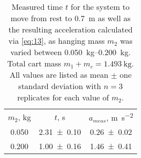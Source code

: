 \begin{table}[hb]
\caption{\label{tab:newtable1} Measured time $t$ for the system to move from rest to \qty{0.7}{\meter} as well as the resulting acceleration calculated via \cref{eq:13}, as hanging mass $m_2$ was varied between \qtyrange{0.050}{0.200}{\kilo\gram}.  Total cart mass $m_1 + m_c =\qty{1.493}{\kilogram}$. All values are listed as mean $\pm$ one standard deviation with $n=3$ replicates for each value of $m_2$.}
\begin{center}
\begin{ruledtabular}
\begin{tabular}{ccc}
$m_2$, \unit{\kilo\gram} & $t$, \unit{\second} & $a_{meas}$, \unit{\meter\per\second\squared} \\ 
\colrule
\num{0.050} & \num{2.31\pm0.10} & \num{0.26\pm0.02} \\ 
\num{0.200} & \num{1.00\pm0.16} & \num{1.46\pm0.41} \\ 
\end{tabular}
\end{ruledtabular}
\end{center}
\end{table}
